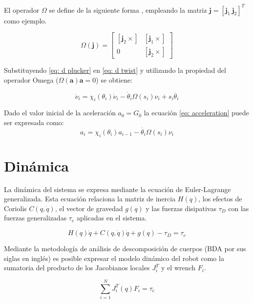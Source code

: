 El operador $\Omega$ se define de la siguiente forma
\cite{olguin2019multibody}, empleando la matriz 
$\mathbf j = [\mathbf j_1 \ \mathbf j_2]^T$
como ejemplo.

\begin{equation}\label{eq: Omega}
 \Omega(\mathbf j) = \begin{bmatrix}
           [\mathbf j_2 \times] & [\mathbf j_1 \times] \\
           0 & [\mathbf j_2 \times]
          \end{bmatrix}
\end{equation}

Substituyendo \eqref{eq: d plucker} 
en \eqref{eq: d twist} 
y utilizando la propiedad del operador Omega
($\Omega(\mathbf a) \mathbf a =0$)
\cite{olguin2019stewart}
se obtiene: 

\begin{equation}\label{eq: acceleration}
\dot \nu_i = \chi_i(\theta_i)\dot{\nu}_i - \dot \theta_i \Omega(s_i) \nu_i+ s_i\ddot{\theta_i}
\end{equation}

Dado el valor inicial de la aceleración 
$a_0 = G_0$ la ecuación \eqref{eq: acceleration} 
puede ser expresada como:
\begin{equation}
a_i = \chi_i(\theta_i) a_{i-1} - \dot{\theta_i}\Omega(s_i) \nu_i
\end{equation}

\section{Dinámica}

La dinámica del sistema se expresa mediante la ecuación 
de Euler-Lagrange generalizada. 
Esta ecuación relaciona la matriz de inercia $H(q)$,
los efectos de Coriolis $C(q,\dot q)$, el vector de
gravedad $g(q)$ y las fuerzas disipativas $\tau_D$ con 
las fuerzas generalizadas $\tau_e$ aplicadas en el sistema.

\begin{equation}\label{eq: lagrangiano_modelo}
H(q)\ddot{q} + C(q,\dot{q})\dot{q} +g(q) - \tau_D = \tau_e
\end{equation}

Mediante la metodología de 
análisis de descomposición de cuerpos 
(BDA por sus siglas en inglés) \cite{olguin2019multibody} 
es posible expresar
el modelo dinámico del robot como la sumatoria 
del producto de los Jacobianos locales 
$J_i^T$ y el wrench $F_i$.

\begin{equation}
\sum_{i=1}^N J_i^T(q)F_i = \tau_e
\end{equation}

